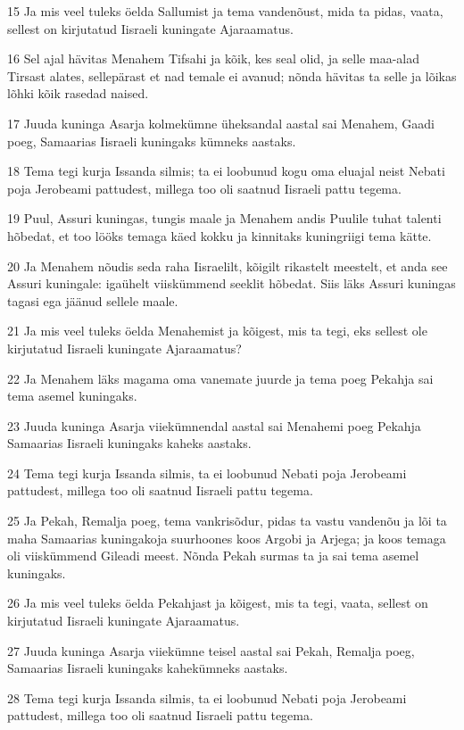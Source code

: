 \par 15 Ja mis veel tuleks öelda Sallumist ja tema vandenõust, mida ta pidas, vaata, sellest on kirjutatud Iisraeli kuningate Ajaraamatus.
\par 16 Sel ajal hävitas Menahem Tifsahi ja kõik, kes seal olid, ja selle maa-alad Tirsast alates, sellepärast et nad temale ei avanud; nõnda hävitas ta selle ja lõikas lõhki kõik rasedad naised.
\par 17 Juuda kuninga Asarja kolmekümne üheksandal aastal sai Menahem, Gaadi poeg, Samaarias Iisraeli kuningaks kümneks aastaks.
\par 18 Tema tegi kurja Issanda silmis; ta ei loobunud kogu oma eluajal neist Nebati poja Jerobeami pattudest, millega too oli saatnud Iisraeli pattu tegema.
\par 19 Puul, Assuri kuningas, tungis maale ja Menahem andis Puulile tuhat talenti hõbedat, et too lööks temaga käed kokku ja kinnitaks kuningriigi tema kätte.
\par 20 Ja Menahem nõudis seda raha Iisraelilt, kõigilt rikastelt meestelt, et anda see Assuri kuningale: igaühelt viiskümmend seeklit hõbedat. Siis läks Assuri kuningas tagasi ega jäänud sellele maale.
\par 21 Ja mis veel tuleks öelda Menahemist ja kõigest, mis ta tegi, eks sellest ole kirjutatud Iisraeli kuningate Ajaraamatus?
\par 22 Ja Menahem läks magama oma vanemate juurde ja tema poeg Pekahja sai tema asemel kuningaks.
\par 23 Juuda kuninga Asarja viiekümnendal aastal sai Menahemi poeg Pekahja Samaarias Iisraeli kuningaks kaheks aastaks.
\par 24 Tema tegi kurja Issanda silmis, ta ei loobunud Nebati poja Jerobeami pattudest, millega too oli saatnud Iisraeli pattu tegema.
\par 25 Ja Pekah, Remalja poeg, tema vankrisõdur, pidas ta vastu vandenõu ja lõi ta maha Samaarias kuningakoja suurhoones koos Argobi ja Arjega; ja koos temaga oli viiskümmend Gileadi meest. Nõnda Pekah surmas ta ja sai tema asemel kuningaks.
\par 26 Ja mis veel tuleks öelda Pekahjast ja kõigest, mis ta tegi, vaata, sellest on kirjutatud Iisraeli kuningate Ajaraamatus.
\par 27 Juuda kuninga Asarja viiekümne teisel aastal sai Pekah, Remalja poeg, Samaarias Iisraeli kuningaks kahekümneks aastaks.
\par 28 Tema tegi kurja Issanda silmis, ta ei loobunud Nebati poja Jerobeami pattudest, millega too oli saatnud Iisraeli pattu tegema.
